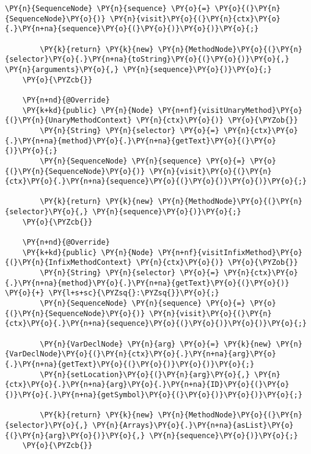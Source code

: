 \begin{Verbatim}[commandchars=\\\{\}]
        \PY{n}{SequenceNode} \PY{n}{sequence} \PY{o}{=} \PY{o}{(}\PY{n}{SequenceNode}\PY{o}{)} \PY{n}{visit}\PY{o}{(}\PY{n}{ctx}\PY{o}{.}\PY{n+na}{sequence}\PY{o}{(}\PY{o}{)}\PY{o}{)}\PY{o}{;}

        \PY{k}{return} \PY{k}{new} \PY{n}{MethodNode}\PY{o}{(}\PY{n}{selector}\PY{o}{.}\PY{n+na}{toString}\PY{o}{(}\PY{o}{)}\PY{o}{,} \PY{n}{arguments}\PY{o}{,} \PY{n}{sequence}\PY{o}{)}\PY{o}{;}
    \PY{o}{\PYZcb{}}
    
    \PY{n+nd}{@Override}
    \PY{k+kd}{public} \PY{n}{Node} \PY{n+nf}{visitUnaryMethod}\PY{o}{(}\PY{n}{UnaryMethodContext} \PY{n}{ctx}\PY{o}{)} \PY{o}{\PYZob{}}
        \PY{n}{String} \PY{n}{selector} \PY{o}{=} \PY{n}{ctx}\PY{o}{.}\PY{n+na}{method}\PY{o}{.}\PY{n+na}{getText}\PY{o}{(}\PY{o}{)}\PY{o}{;}
        \PY{n}{SequenceNode} \PY{n}{sequence} \PY{o}{=} \PY{o}{(}\PY{n}{SequenceNode}\PY{o}{)} \PY{n}{visit}\PY{o}{(}\PY{n}{ctx}\PY{o}{.}\PY{n+na}{sequence}\PY{o}{(}\PY{o}{)}\PY{o}{)}\PY{o}{;}

        \PY{k}{return} \PY{k}{new} \PY{n}{MethodNode}\PY{o}{(}\PY{n}{selector}\PY{o}{,} \PY{n}{sequence}\PY{o}{)}\PY{o}{;}
    \PY{o}{\PYZcb{}}

    \PY{n+nd}{@Override}
    \PY{k+kd}{public} \PY{n}{Node} \PY{n+nf}{visitInfixMethod}\PY{o}{(}\PY{n}{InfixMethodContext} \PY{n}{ctx}\PY{o}{)} \PY{o}{\PYZob{}}
        \PY{n}{String} \PY{n}{selector} \PY{o}{=} \PY{n}{ctx}\PY{o}{.}\PY{n+na}{method}\PY{o}{.}\PY{n+na}{getText}\PY{o}{(}\PY{o}{)} \PY{o}{+} \PY{l+s+sc}{\PYZsq{}:\PYZsq{}}\PY{o}{;}
        \PY{n}{SequenceNode} \PY{n}{sequence} \PY{o}{=} \PY{o}{(}\PY{n}{SequenceNode}\PY{o}{)} \PY{n}{visit}\PY{o}{(}\PY{n}{ctx}\PY{o}{.}\PY{n+na}{sequence}\PY{o}{(}\PY{o}{)}\PY{o}{)}\PY{o}{;}

        \PY{n}{VarDeclNode} \PY{n}{arg} \PY{o}{=} \PY{k}{new} \PY{n}{VarDeclNode}\PY{o}{(}\PY{n}{ctx}\PY{o}{.}\PY{n+na}{arg}\PY{o}{.}\PY{n+na}{getText}\PY{o}{(}\PY{o}{)}\PY{o}{)}\PY{o}{;}
        \PY{n}{setLocation}\PY{o}{(}\PY{n}{arg}\PY{o}{,} \PY{n}{ctx}\PY{o}{.}\PY{n+na}{arg}\PY{o}{.}\PY{n+na}{ID}\PY{o}{(}\PY{o}{)}\PY{o}{.}\PY{n+na}{getSymbol}\PY{o}{(}\PY{o}{)}\PY{o}{)}\PY{o}{;}

        \PY{k}{return} \PY{k}{new} \PY{n}{MethodNode}\PY{o}{(}\PY{n}{selector}\PY{o}{,} \PY{n}{Arrays}\PY{o}{.}\PY{n+na}{asList}\PY{o}{(}\PY{n}{arg}\PY{o}{)}\PY{o}{,} \PY{n}{sequence}\PY{o}{)}\PY{o}{;}
    \PY{o}{\PYZcb{}}


\end{Verbatim}

